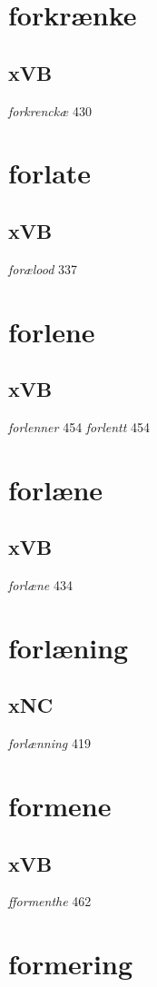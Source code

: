 \documentclass[a4paper,twocolumn]{article}
\begin{document}
\section{forkrænke}
\label{sec:orga013f16}
\subsection{xVB}
\label{sec:org8d90fa7}
\emph{forkrenckæ} 430 
\section{forlate}
\label{sec:orgbaeee0b}
\subsection{xVB}
\label{sec:orge9dbdbf}
\emph{forælood} 337 
\section{forlene}
\label{sec:org54b1390}
\subsection{xVB}
\label{sec:org5c24500}
\emph{forlenner} 454 \emph{forlentt} 454 
\section{forlæne}
\label{sec:orgccf5954}
\subsection{xVB}
\label{sec:orgfe83efb}
\emph{forlæne} 434 
\section{forlæning}
\label{sec:org5139198}
\subsection{xNC}
\label{sec:org19c7200}
\emph{forlænning} 419 
\section{formene}
\label{sec:orgd8ac5fb}
\subsection{xVB}
\label{sec:org3b9229d}
\emph{fformenthe} 462 
\section{formering}
\label{sec:org8d87aef}
\end{document}
